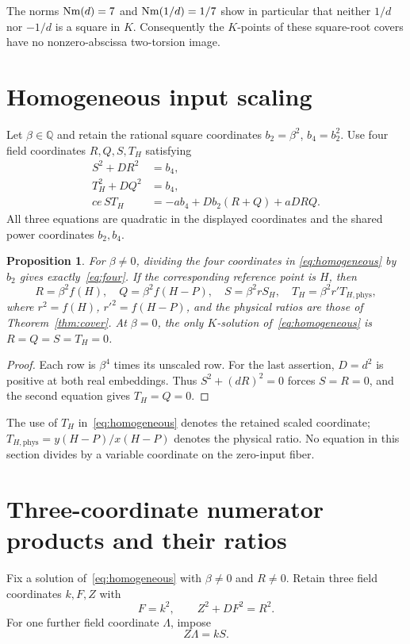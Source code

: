 \documentclass[11pt,a4paper]{article}
\newtheorem{proposition}[theorem]{Proposition}
\newcommand{\Q}{\mathbb Q}\newcommand{\Z}{\mathbb Z}
\begin{document}
The norms $\operatorname{Nm}(d)=7$ and $\operatorname{Nm}(1/d)=1/7$ show in particular that
neither $1/d$ nor $-1/d$ is a square in $K$.
Consequently the $K$-points of these square-root covers have no
nonzero-abscissa two-torsion image.

\section{Homogeneous input scaling}
Let $\beta\in\Q$ and retain the rational square coordinates
$b_2=\beta^2$, $b_4=b_2^2$. Use four field coordinates
$R,Q,S,T_H$ satisfying
\begin{equation}\label{eq:homogeneous}
 \begin{split}
 S^2+DR^2&=b_4,\\
 T_H^2+DQ^2&=b_4,\\
 ce\,S T_H&=-ab_4+Db_2(R+Q)+aDRQ.
 \end{split}
\end{equation}
All three equations are quadratic in the displayed coordinates and
the shared power coordinates $b_2,b_4$.

\begin{proposition}\label{prop:scaling}
For $\beta\ne0$, dividing the four coordinates in
\eqref{eq:homogeneous} by $b_2$ gives exactly~\eqref{eq:four}.
If the corresponding reference point is $H$, then
\[
 R=\beta^2 f(H),\quad Q=\beta^2 f(H-P),\quad
 S=\beta^2 rS_H,\quad T_H=\beta^2 r'T_{H,\mathrm{phys}},
\]
where $r^2=f(H)$, $r'^2=f(H-P)$, and the physical ratios are
those of Theorem~\ref{thm:cover}. At $\beta=0$, the only
$K$-solution of~\eqref{eq:homogeneous} is $R=Q=S=T_H=0$.
\end{proposition}
\begin{proof}
Each row is $\beta^4$ times its unscaled row. For the last
assertion, $D=d^2$ is positive at both real embeddings. Thus
$S^2+(dR)^2=0$ forces $S=R=0$, and the second equation gives
$T_H=Q=0$.
\end{proof}

The use of $T_H$ in~\eqref{eq:homogeneous} denotes the retained
scaled coordinate; $T_{H,\mathrm{phys}}=y(H-P)/x(H-P)$ denotes
the physical ratio. No equation in this section divides by a variable
coordinate on the zero-input fiber.

\section{Three-coordinate numerator products and their ratios}
Fix a solution of~\eqref{eq:homogeneous} with $\beta\ne0$ and
$R\ne0$. Retain three field coordinates $k,F,Z$ with
\begin{equation}\label{eq:numerator}
                       F=k^2,\qquad Z^2+DF^2=R^2.
\end{equation}
For one further field coordinate $\Lambda$, impose
\begin{equation}\label{eq:ratio}
                              Z\Lambda=kS.
\end{equation}
\end{document}
